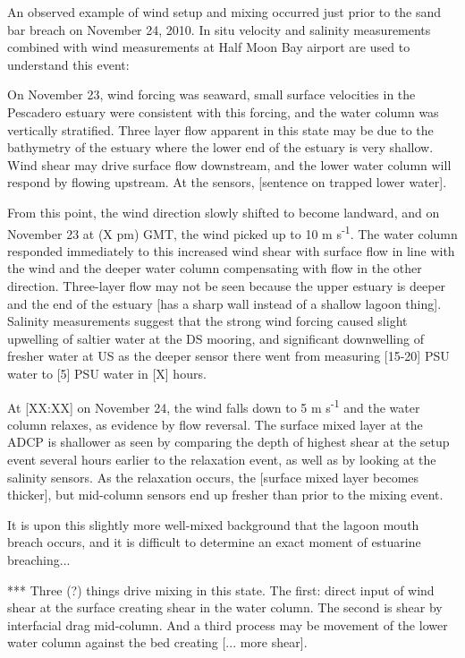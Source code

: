 

An observed example of wind setup and mixing occurred just prior to the
sand bar breach on November 24, 2010. In situ velocity and salinity
measurements combined with wind measurements at Half Moon Bay airport
are used to understand this event:

On November 23, wind forcing was seaward, small surface velocities in
the Pescadero estuary were consistent with this forcing, and the water
column was vertically stratified. Three layer flow apparent in this
state may be due to the bathymetry of the estuary where the lower end of
the estuary is very shallow. Wind shear may drive surface flow
downstream, and the lower water column will respond by flowing upstream.
At the sensors, [sentence on trapped lower water].

From this point, the wind direction slowly shifted to become landward,
and on November 23 at (X pm) GMT, the wind picked up to 10 m
s\textsuperscript{-1}. The water column responded immediately to this
increased wind shear with surface flow in line with the wind and the
deeper water column compensating with flow in the other direction.
Three-layer flow may not be seen because the upper estuary is deeper and
the end of the estuary [has a sharp wall instead of a shallow lagoon
thing]. Salinity measurements suggest that the strong wind forcing
caused slight upwelling of saltier water at the DS mooring, and
significant downwelling of fresher water at US as the deeper sensor
there went from measuring [15-20] PSU water to [5] PSU water in [X]
hours.

At [XX:XX] on November 24, the wind falls down to 5 m
s\textsuperscript{-1} and the water column relaxes, as evidence by flow
reversal. The surface mixed layer at the ADCP is shallower as seen by
comparing the depth of highest shear at the setup event several hours
earlier to the relaxation event, as well as by looking at the salinity
sensors. As the relaxation occurs, the [surface mixed layer becomes
thicker], but mid-column sensors end up fresher than prior to the mixing
event.

It is upon this slightly more well-mixed background that the lagoon
mouth breach occurs, and it is difficult to determine an exact moment of
estuarine breaching...

*** Three (?) things drive mixing in this state. The first: direct input
of wind shear at the surface creating shear in the water column.  The
second is shear by interfacial drag mid-column. And a third process may
be movement of the lower water column against the bed creating [... more
shear].


